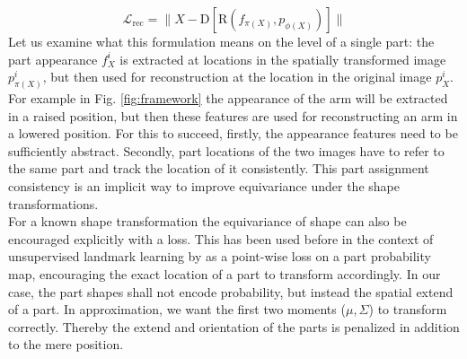 	\begin{equation}
	\mathcal{L}_{\textrm{rec}}= \lVert  X  - \mathrm{D}[\mathrm{R}(f_{\pi(X)}, p_{\phi(X)})]\rVert
	\end{equation}
	\label{eq:loss_rec}
	Let us examine what this formulation means on the level of a single part: the part appearance $f^i_X$ is extracted at locations in the spatially transformed image $p^i_{\pi(X)}$, but then used for reconstruction at the location in the original image $p^i_{X}$. For example in Fig.  \ref{fig:framework} the appearance of the arm will be extracted in a raised position, but then these features are used for reconstructing an arm in a lowered position. For this to succeed, firstly, the appearance features need to be sufficiently abstract. Secondly, part locations of the two images have to refer to the same part and track the location of it consistently. This part assignment consistency is an implicit way to improve equivariance under the shape transformations.\\
	For a known shape transformation the equivariance of shape can also be encouraged explicitly with a loss. This has been used before in the context of unsupervised landmark learning by \cite{thewlis17, zhang18} as a point-wise loss on a part probability map, encouraging the exact location of a part to transform accordingly. In our case, the part shapes shall not encode probability, but instead the spatial extend of a part. In approximation, we want the first two moments ($\mu, \Sigma$) to transform correctly. Thereby the extend and orientation of the parts is penalized in addition to the mere position.
